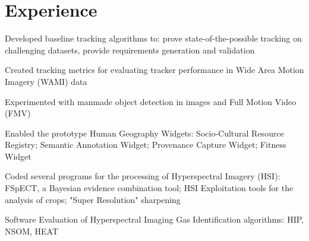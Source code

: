 \documentclass[letterpaper]{deedy-resume} %
\begin{document}
\begin{minipage}[t]{0.69\textwidth} %


\section{Experience}


\vspace{\topsep}
\begin{tightitemize}
\item Developed baseline tracking algorithms to: prove state-of-the-possible tracking on challenging datasets, provide requirements generation and validation
\item Created tracking metrics for evaluating tracker performance in Wide Area Motion Imagery (WAMI) data
\item Experimented with manmade object detection in images and Full Motion Video (FMV)
\item Enabled the prototype Human Geography Widgets: Socio-Cultural Resource Registry; Semantic Annotation Widget; Provenance Capture Widget; Fitness Widget
\item Coded several programs for the processing of Hyperspectral Imagery (HSI): FSpECT, a Bayesian evidence combination tool;  HSI Exploitation tools for the analysis of crops; "Super Resolution" sharpening
\item Software Evaluation of Hyperspectral Imaging Gas Identification algorithms: HIP, NSOM, HEAT
\end{tightitemize}


\end{minipage}
\end{document}
